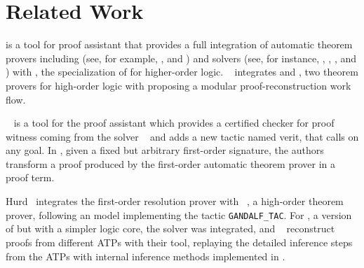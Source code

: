 \documentclass[../main.tex]{subfiles}
\begin{document}

\section{Related Work}
\label{sec:related-work}

 is a tool for  proof assistant
\cite{paulson1994isabelle} that provides a full integration of
automatic theorem provers including \ATPs (see, for example,
\cite{meng2006automation}, \cite{blanchette2013extending} and
\cite{Fleury2014}) and \SMT solvers (see, for instance,
\cite{hurlin07practical}, \cite{bohme2010},
\cite{blanchette2013extending}, and \cite{Fleury2014}) with
 \cite{nipkow2002isabelle}, the specialization of
 for higher-order logic.
\citeauthor{Een2004}~\cite{Een2004} integrates  and
, two theorem provers for high-order logic with
 proposing a modular proof-reconstruction work
flow.

~\cite{armand2011,Ekici2017} is a tool for the
 proof assistant \cite{coqteam} which provides a certified
checker for proof witness coming from the \SMT solver
~\cite{bouton2009} and adds a new tactic named verit,
that calls  on any  goal.
In \cite{Bezem2002},
given a fixed but arbitrary first-order signature, the authors
transform a proof produced by the first-order automatic theorem
prover  \cite{deNivelle2003} in a  proof
term.

Hurd~\cite{Hurd1999} integrates the first-order resolution prover
 with ~\cite{norrish2007hol}, a high-order
theorem prover, following an  model implementing the
tactic \verb!GANDALF_TAC!. For , a version of
 but with a simpler logic core, the \SMT solver 
was integrated, and \citeauthor{kaliszyk2013}~\cite{kaliszyk2013}
reconstruct proofs from different ATPs with their  tool,
replaying the detailed inference steps from the ATPs with internal
inference methods implemented in .



\end{document}
